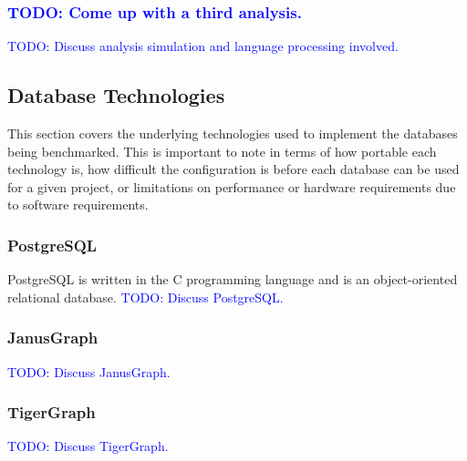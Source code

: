 \subsubsection{\textcolor{blue}{ TODO: Come up with a third analysis.}}
\textcolor{blue}{ TODO: Discuss analysis simulation and language processing involved.}

\subsection{Database Technologies}

This section covers the underlying technologies used to implement the databases being benchmarked. This is important to note in terms of how portable each technology is, how difficult the configuration is before each database can be used for a given project, or limitations on performance or hardware requirements due to software requirements.

\subsubsection{PostgreSQL}
PostgreSQL is written in the C programming language and is an object-oriented relational database.
\textcolor{blue}{ TODO: Discuss PostgreSQL.}
\subsubsection{JanusGraph}
\textcolor{blue}{ TODO: Discuss JanusGraph.}
\subsubsection{TigerGraph}
\textcolor{blue}{ TODO: Discuss TigerGraph.}